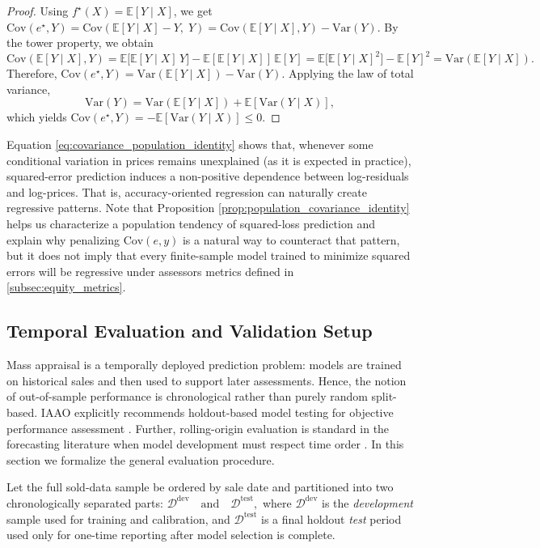 \documentclass[12pt, draft]{article}
\theoremstyle{plain}
\theoremstyle{definition}
\newcommand{\E}{\mathbb{E}}
\newcommand{\1}{\mathbf{1}}
\newcommand{\Cov}{\text{Cov}}
\newcommand{\Var}{\text{Var}}
\begin{document}
{\begin{proof}
Using $f^\star(X)=\E[Y\mid X]$, we get
$
\Cov(e^\star,Y)
=
\Cov(\E[Y\mid X]-Y,\;Y)
=
\Cov(\E[Y\mid X],Y)-\Var(Y).
$
By the tower property, we obtain
\[
\Cov(\E[Y\mid X],Y)
=
\E\!\big[\E[Y\mid X]\,Y\big]-\E[\E[Y\mid X]]\,\E[Y]
=
\E\!\big[\E[Y\mid X]^2\big]-\E[Y]^2
=
\Var(\E[Y\mid X]).
\]
Therefore,
$
\Cov(e^\star,Y)=\Var(\E[Y\mid X])-\Var(Y).
$
Applying the law of total variance,
\[
\Var(Y)=\Var(\E[Y\mid X])+\E[\Var(Y\mid X)],
\]
which yields
$
\Cov(e^\star,Y)
=
-\E\!\left[\Var(Y\mid X)\right]
\le 0.
$
\end{proof}

Equation \eqref{eq:covariance_population_identity} shows that, whenever some conditional variation in prices remains unexplained (as it is expected in practice), squared-error prediction induces a non-positive dependence between log-residuals and log-prices. That is, accuracy-oriented regression can naturally create regressive patterns. Note that Proposition \ref{prop:population_covariance_identity} helps us characterize a population tendency of squared-loss prediction and explain why penalizing $\Cov(e,y)$ is a natural way to counteract that pattern, but it does not imply that every finite-sample model trained to minimize squared errors will be regressive under assessors metrics defined in \ref{subsec:equity_metrics}.





\subsection{Temporal Evaluation and Validation Setup}
\label{subsec:oos_protocol}


Mass appraisal is a temporally deployed prediction problem: models are trained on historical sales and then used to support later assessments. Hence, the notion of out-of-sample performance is chronological rather than purely random split-based. IAAO explicitly recommends holdout-based model testing for objective performance assessment \cite{IAAO2025Mass}. Further, rolling-origin evaluation is standard in the forecasting literature when model development must respect time order \cite{tashman2000out}. In this section we formalize the general evaluation procedure.

Let the full sold-data sample be ordered by sale date and partitioned into two chronologically separated parts:
$
\mathcal{D}^{\mathrm{dev}}
\quad\text{and}\quad
\mathcal{D}^{\mathrm{test}},
$
where $\mathcal{D}^{\mathrm{dev}}$ is the \textit{development} sample used for training and calibration, and $\mathcal{D}^{\mathrm{test}}$ is a final holdout \textit{test} period used only for one-time reporting after model selection is complete.

}
\end{document}
